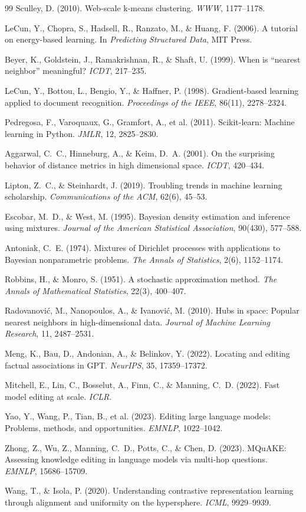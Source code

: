 \documentclass[11pt,a4paper]{article}
\begin{document}
\begin{thebibliography}{99}
 Sculley, D. (2010). Web-scale k-means clustering. \textit{WWW}, 1177–1178.

 LeCun, Y., Chopra, S., Hadsell, R., Ranzato, M., \& Huang, F. (2006). A tutorial on energy-based learning. In \textit{Predicting Structured Data}, MIT Press.

 Beyer, K., Goldstein, J., Ramakrishnan, R., \& Shaft, U. (1999). When is ``nearest neighbor'' meaningful? \textit{ICDT}, 217–235.

 LeCun, Y., Bottou, L., Bengio, Y., \& Haffner, P. (1998). Gradient-based learning applied to document recognition. \textit{Proceedings of the IEEE}, 86(11), 2278–2324.

 Pedregosa, F., Varoquaux, G., Gramfort, A., et al. (2011). Scikit-learn: Machine learning in Python. \textit{JMLR}, 12, 2825–2830.

 Aggarwal, C.~C., Hinneburg, A., \& Keim, D.~A. (2001). On the surprising behavior of distance metrics in high dimensional space. \textit{ICDT}, 420–434.

 Lipton, Z.~C., \& Steinhardt, J. (2019). Troubling trends in machine learning scholarship. \textit{Communications of the ACM}, 62(6), 45–53.

 Escobar, M.~D., \& West, M. (1995). Bayesian density estimation and inference using mixtures. \textit{Journal of the American Statistical Association}, 90(430), 577--588.

 Antoniak, C.~E. (1974). Mixtures of Dirichlet processes with applications to Bayesian nonparametric problems. \textit{The Annals of Statistics}, 2(6), 1152--1174.

 Robbins, H., \& Monro, S. (1951). A stochastic approximation method. \textit{The Annals of Mathematical Statistics}, 22(3), 400--407.

 Radovanovi\'c, M., Nanopoulos, A., \& Ivanovi\'c, M. (2010). Hubs in space: Popular nearest neighbors in high-dimensional data. \textit{Journal of Machine Learning Research}, 11, 2487--2531.

 Meng, K., Bau, D., Andonian, A., \& Belinkov, Y. (2022). Locating and editing factual associations in GPT. \textit{NeurIPS}, 35, 17359--17372.

 Mitchell, E., Lin, C., Bosselut, A., Finn, C., \& Manning, C.~D. (2022). Fast model editing at scale. \textit{ICLR}.

 Yao, Y., Wang, P., Tian, B., et al. (2023). Editing large language models: Problems, methods, and opportunities. \textit{EMNLP}, 1022--1042.

 Zhong, Z., Wu, Z., Manning, C.~D., Potts, C., \& Chen, D. (2023). MQuAKE: Assessing knowledge editing in language models via multi-hop questions. \textit{EMNLP}, 15686--15709.

 Wang, T., \& Isola, P. (2020). Understanding contrastive representation learning through alignment and uniformity on the hypersphere. \textit{ICML}, 9929--9939.

\end{thebibliography}
\end{document}

